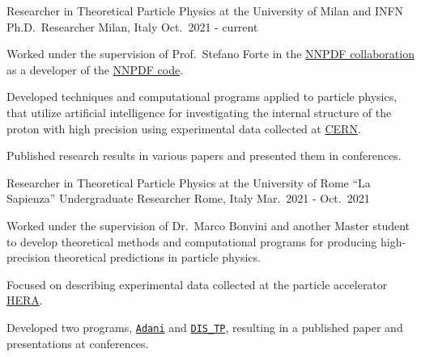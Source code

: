 

\begin{cventries}

  \cventry
  {Researcher in Theoretical Particle Physics at the University of Milan and INFN}
  {Ph.D.\ Researcher}
  {Milan, Italy}
  {Oct.\ 2021 - current}
  {
      \begin{cvitems} %
          \item Worked under the supervision of Prof.\ Stefano Forte in the \href{https://nnpdf.mi.infn.it}{NNPDF collaboration} 
          as a developer of the \href{https://github.com/NNPDF}{NNPDF code}.
          \item Developed techniques and computational programs applied to particle physics, that utilize artificial intelligence for 
          investigating the internal structure of the proton with high precision using experimental data collected at \href{https://home.cern}{CERN}.
          \item Published research results in various papers and presented them in conferences.
      \end{cvitems}
    }

    \cventry
{Researcher in Theoretical Particle Physics at the University of Rome ``La Sapienza''}
{Undergraduate Researcher}
{Rome, Italy}
{Mar.\ 2021 - Oct.\ 2021}
{
      \begin{cvitems} %
        \item Worked under the supervision of Dr.\ Marco Bonvini and another Master student to develop theoretical methods and computational programs for producing high-precision theoretical predictions in particle physics.
        \item Focused on describing experimental data collected at the particle accelerator \href{https://en.wikipedia.org/wiki/HERA_(particle_accelerator)}{HERA}.
        \item Developed two programs, \href{https://github.com/niclaurenti/adani}{\texttt{Adani}} and \href{https://github.com/andreab1997/DIS_TP}{\texttt{DIS\_TP}}, resulting in a published paper and presentations at conferences.
      \end{cvitems}
    }


\end{cventries}
